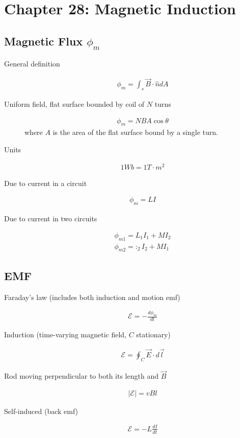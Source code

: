 \documentclass[../main.tex]{subfiles}
\begin{document}
\section{Chapter 28: Magnetic Induction}
\label{sec:chapter_28_magnetic_induction}

\subsection{Magnetic Flux $\phi_m$}
\label{sub:magnetic_flux_phi_m_}

\begin{description}
  \item[General definition]
    \begin{align}
      \phi_m = \int_s\vec{B} \cdot \hat{n} dA
    \end{align}
  \item[Uniform field, flat surface bounded by coil of $N$ turns]
    \begin{align}
      \phi_m = NBA\cos\theta
    \end{align}
    where $A$ is the area of the flat surface bound by a single turn.
  \item[Units]
    \begin{align}
      1Wb = 1T\cdot m^2
    \end{align}
  \item[Due to current in a circuit]
    \begin{align}
      \phi_m = LI
    \end{align}
  \item[Due to current in two circuits]
    \begin{align}
      \phi_{m1} = L_1I_1+MI_2\\
      \phi_{m2}=:_2I_2+MI_1
    \end{align}
\end{description}

\subsection{EMF}
\label{sub:emf}

\begin{description}
  \item[Faraday's law (includes both induction and motion emf)]
    \begin{align}
      \mathcal{E} = -\frac{d\phi_m}{dt}
    \end{align}
  \item[Induction (time-varying magnetic field, $C$ stationary)]
    \begin{align}
      \mathcal{E} = \oint_C\vec{E}\cdot d\vec{l}
    \end{align}
  \item[Rod moving perpendicular to both its length and $\vec{B}$]
    \begin{align}
      |\mathcal{E}| = vBl
    \end{align}
  \item[Self-induced (back emf)]
    \begin{align}
    \mathcal{E} = -L\frac{dI}{dt}
  \end{align}
\end{description}
\end{document}
